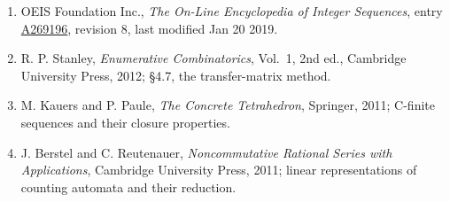 \documentclass[11pt]{article}
\theoremstyle{definition}
\begin{document}
\begin{enumerate}

\item OEIS Foundation Inc., \emph{The On-Line Encyclopedia of Integer Sequences}, entry \href{https://oeis.org/A269196}{A269196}, revision 8, last modified Jan 20 2019.

\item R. P. Stanley, \emph{Enumerative Combinatorics}, Vol.~1, 2nd ed., Cambridge University Press, 2012; \S4.7, the transfer-matrix method.

\item M. Kauers and P. Paule, \emph{The Concrete Tetrahedron}, Springer, 2011; C-finite sequences and their closure properties.

\item J. Berstel and C. Reutenauer, \emph{Noncommutative Rational Series with Applications}, Cambridge University Press, 2011; linear representations of counting automata and their reduction.

\end{enumerate}
\end{document}
